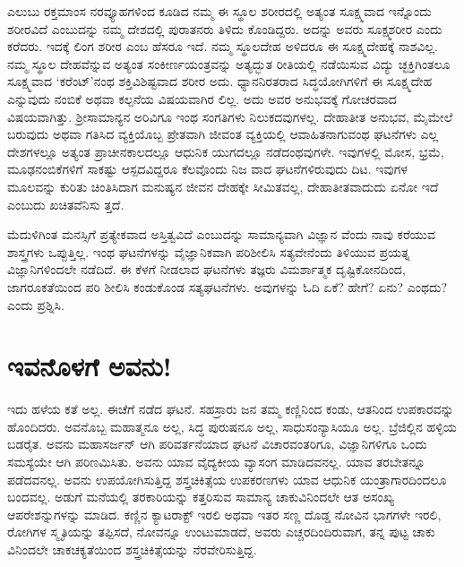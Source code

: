ಎಲುಬು ರಕ್ತಮಾಂಸ ನರವ್ಯೂಹಗಳಿಂದ ಕೂಡಿದ ನಮ್ಮ ಈ ಸ್ಥೂಲ ಶರೀರದಲ್ಲಿ ಅತ್ಯಂತ ಸೂಕ್ಷ್ಮವಾದ ಇನ್ನೊಂದು ಶರೀರವಿದೆ ಎಂಬುದನ್ನು ನಮ್ಮ ದೇಶದಲ್ಲಿ ಪುರಾತನರು ತಿಳಿದು ಕೊಂಡಿದ್ದರು. ಅದನ್ನು ಅವರು ಸೂಕ್ಷ್ಮಶರೀರ ಎಂದು ಕರೆದರು. ಇದಕ್ಕೆ ಲಿಂಗ ಶರೀರ ಎಂಬ ಹೆಸರೂ ಇದೆ. ನಮ್ಮ ಸ್ಥೂಲದೇಹ ಅಳಿದರೂ ಈ ಸೂಕ್ಷ್ಮದೇಹಕ್ಕೆ ನಾಶವಿಲ್ಲ. ನಮ್ಮ ಸ್ಥೂಲ ದೇಹವೆನ್ನುವ ಅತ್ಯಂತ ಸಂಕೀರ್ಣಯಂತ್ರವನ್ನು ಅತ್ಯದ್ಭುತ ರೀತಿಯಲ್ಲಿ ನಡೆಯಿಸುವ ವಿದ್ಯು ಚ್ಛಕ್ತಿಗಿಂತಲೂ ಸೂಕ್ಷ್ಮವಾದ ‘ಕರೆಂಟ್​’ನಂಥ ಶಕ್ತಿವಿಶಿಷ್ಟವಾದ ಶರೀರ ಅದು. ಧ್ಯಾನನಿರತರಾದ ಸಿದ್ಧಯೋಗಿಗಳಿಗೆ ಈ ಸೂಕ್ಷ್ಮದೇಹ ಎನ್ನುವುದು ನಂಬಿಕೆ ಅಥವಾ ಕಲ್ಪನೆಯ ವಿಷಯವಾಗಿರ ಲಿಲ್ಲ. ಅದು ಅವರ ಅನುಭವಕ್ಕೆ ಗೋಚರವಾದ ವಿಷಯವಾಗಿತ್ತು. ಶ‍್ರೀಸಾಮಾನ್ಯನ ಅರಿವಿಗೂ ಇಂಥ ಸಂಗತಿಗಳು ನಿಲುಕದವುಗಳಲ್ಲ. ದೇಹಾತೀತ ಅನುಭವ, ಮೈಮೇಲೆ ಬರುವುದು ಅಥವಾ ಗತಿಸಿದ ವ್ಯಕ್ತಿಯೊಬ್ಬ ಪ್ರೇತವಾಗಿ ಜೀವಂತ ವ್ಯಕ್ತಿಯಲ್ಲಿ ಆವಾಹಿತನಾಗುವಂಥ ಘಟನೆಗಳು ಎಲ್ಲ ದೇಶಗಳಲ್ಲೂ ಅತ್ಯಂತ ಪ್ರಾಚೀನಕಾಲದಲ್ಲೂ ಆಧುನಿಕ ಯುಗದಲ್ಲೂ ನಡೆದಂಥವುಗಳೇ. ಇವುಗಳಲ್ಲಿ ಮೋಸ, ಭ್ರಮೆ, ಮೂಢನಂಬಿಕೆಗಳಿಗೆ ಸಾಕಷ್ಟು ಆಸ್ಪದವಿದ್ದರೂ ಕೆಲವೊಂದು ನಿಜ ವಾದ ಘಟನೆಗಳಿರುವುದು ದಿಟ. ಇವುಗಳ ಮೂಲವನ್ನು ಕುರಿತು ಚಿಂತಿಸಿದಾಗ ಮನುಷ್ಯನ ಜೀವನ ದೇಹಕ್ಕೇ ಸೀಮಿತವಲ್ಲ, ದೇಹಾತೀತವಾದುದು ಏನೋ ಇದೆ ಎಂಬುದು ಖಚಿತವೆನಿಸು ತ್ತದೆ.

ಮೆದುಳಿಗಿಂತ ಮನಸ್ಸಿಗೆ ಪ್ರತ್ಯೇಕವಾದ ಅಸ್ತಿತ್ವವಿದೆ ಎಂಬುದನ್ನು ಸಾಮಾನ್ಯವಾಗಿ ವಿಜ್ಞಾನ ವೆಂದು ನಾವು ಕರೆಯುವ ಶಾಸ್ತ್ರಗಳು ಒಪ್ಪುತ್ತಿಲ್ಲ. ಇಂಥ ಘಟನೆಗಳನ್ನು ವೈಜ್ಞಾನಿಕವಾಗಿ ಪರಿಶೀಲಿಸಿ ಸತ್ಯವೇನೆಂದು ತಿಳಿಯುವ ಪ್ರಯತ್ನ ವಿಜ್ಞಾನಿಗಳಿಂದಲೇ ನಡೆದಿದೆ. ಈ ಕೆಳಗೆ ನೀಡಲಾದ ಘಟನೆಗಳು ತಜ್ಞರು ವಿಮರ್ಶಾತ್ಮಕ ದೃಷ್ಟಿಕೋನದಿಂದ, ಜಾಗರೂಕತೆಯಿಂದ ಪರಿ ಶೀಲಿಸಿ ಕಂಡುಕೊಂಡ ಸತ್ಯಘಟನೆಗಳು. ಅವುಗಳನ್ನು ಓದಿ ಏಕೆ? ಹೇಗೆ? ಏನು? ಎಂಥದು? ಎಂದು ಪ್ರಶ್ನಿಸಿ.


\section{ಇವನೊಳಗೆ ಅವನು!}

ಇದು ಹಳೆಯ ಕತೆ ಅಲ್ಲ. ಈಚೆಗೆ ನಡೆದ ಘಟನೆ. ಸಹಸ್ರಾರು ಜನ ತಮ್ಮ ಕಣ್ಣಿನಿಂದ ಕಂಡು, ಆತನಿಂದ ಉಪಕಾರವನ್ನು ಹೊಂದಿದರು. ಅವನೊಬ್ಬ ಮಹಾತ್ಮನೂ ಅಲ್ಲ, ಸಿದ್ಧ ಪುರುಷನೂ ಅಲ್ಲ, ಸಾಧುಸಂನ್ಯಾಸಿಯೂ ಅಲ್ಲ. ಬ್ರೆಜಿಲ್ಲಿನ ಹಳ್ಳಿಯ ಬಡರೈತ. ಅವನು ಮಹಾಸರ್ಜನ್ ಆಗಿ ಪರಿವರ್ತನೆಯಾದ ಘಟನೆ ವಿಚಾರವಂತರಿಗೂ, ವಿಜ್ಞಾನಿಗಳಿಗೂ ಒಂದು ಸಮಸ್ಯೆಯೇ ಆಗಿ ಪರಿಣಮಿಸಿತು. ಅವನು ಯಾವ ವೈದ್ಯಕೀಯ ವ್ಯಾಸಂಗ ಮಾಡಿದವನಲ್ಲ. ಯಾವ ತರಬೇತನ್ನೂ ಪಡೆದವನಲ್ಲ. ಅವನು ಉಪಯೋಗಿಸುತ್ತಿದ್ದ ಶಸ್ತ್ರಚಿಕಿತ್ಸೆಯ ಉಪಕರಣಗಳು ಯಾವ ಆಧುನಿಕ ಯಂತ್ರಾಗಾರದಿಂದಲೂ ಬಂದವಲ್ಲ. ಅಡುಗೆ ಮನೆಯಲ್ಲಿ ತರಕಾರಿಯನ್ನು ಕತ್ತರಿಸುವ ಸಾಮಾನ್ಯ ಚಾಕುವಿನಿಂದಲೇ ಆತ ಅಸಂಖ್ಯ ಆಪರೇಶನ್ನುಗಳನ್ನು ಮಾಡಿದ. ಕಣ್ಣಿನ ಕ್ಯಾಟರಾಕ್ಟ್ ಇರಲಿ ಅಥವಾ ಇತರ ಸಣ್ಣ ದೊಡ್ಡ ನೋವಿನ ಭಾಗಗಳೇ ಇರಲಿ, ರೋಗಿಗಳ ಸ್ಮೃತಿಯನ್ನು ತಪ್ಪಿಸದೆ, ನೋವನ್ನೂ ಉಂಟುಮಾಡದೆ, ಅವರು ಎಚ್ಚರದಿಂದಿರುವಾಗ, ತನ್ನ ಪುಟ್ಟ ಚಾಕು ವಿನಿಂದಲೇ ಚಾಕಚಕ್ಯತೆಯಿಂದ ಶಸ್ತ್ರಚಿಕಿತ್ಸೆಯನ್ನು ನೆರವೇರಿಸುತ್ತಿದ್ದ.


